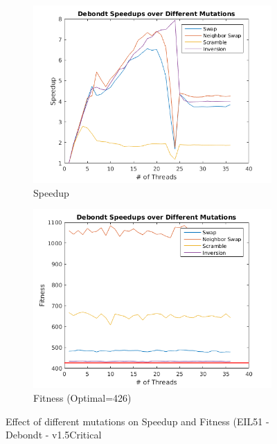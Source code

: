 \documentclass[10pt,letterpaper]{article}
\begin{document}
\begin{figure}[t]
\centering
  \begin{subfigure}{0.49\linewidth} \centering
	 \includegraphics[width=\textwidth]{../img/Debondt_mutations_speedup.png}
    \caption{Speedup}\label{fig:figA}
  \end{subfigure}
  \begin{subfigure}{0.49\linewidth} \centering
	 \includegraphics[width=\textwidth]{../img/Debondt_mutations_fitness.png}
    \caption{Fitness (Optimal=426)}\label{fig:figB}
  \end{subfigure}
\caption{Effect of different mutations on Speedup and Fitness (EIL51 - Debondt - v1.5Critical} \label{fig:mutations}
\end{figure}
\end{document}
